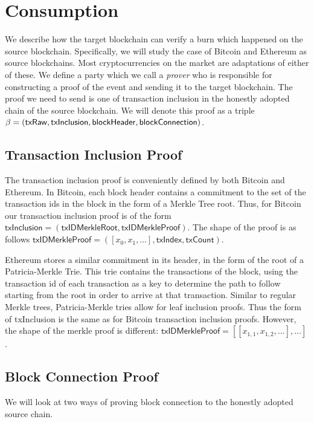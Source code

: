 \section{Consumption}

We describe how the target blockchain can verify a burn which happened on the source blockchain. Specifically, we will study the case of Bitcoin and Ethereum as source blockchains. Most cryptocurrencies on the market are adaptations of either of these. We define a party which we call a \emph{prover} who is responsible for constructing a proof of the event and sending it to the target blockchain. The proof we need to send is one of transaction inclusion in the honestly adopted chain of the source blockchain. We will denote this proof as a triple $\beta = \sf(txRaw, txInclusion, blockHeader, blockConnection)$.

\subsection{Transaction Inclusion Proof}
The transaction inclusion proof is conveniently defined by both Bitcoin and Ethereum. In Bitcoin, each block header contains a commitment to the set of the transaction ids in the block in the form of a Merkle Tree root. Thus, for Bitcoin our transaction inclusion proof is of the form $\mathsf{txInclusion} = (\mathsf{txIDMerkleRoot}, \mathsf{txIDMerkleProof})$. The shape of the proof is as follows $\mathsf{txIDMerkleProof} = ([x_0, x_1, \dots], \mathsf{txIndex}, \mathsf{txCount})$.

Ethereum stores a similar commitment in its header, in the form of the root of a Patricia-Merkle Trie. This trie contains the transactions of the block, using the transaction id of each transaction as a key to determine the path to follow starting from the root in order to arrive at that transaction. Similar to regular Merkle trees, Patricia-Merkle tries allow for leaf inclusion proofs. Thus the form of \textsf{txInclusion} is the same as for Bitcoin transaction inclusion proofs. However, the shape of the merkle proof is different: $\mathsf{txIDMerkleProof} = [[x_{1,1}, x_{1,2}, \dots], \dots]$.

\subsection{Block Connection Proof}

We will look at two ways of proving block connection to the honestly adopted source chain.

